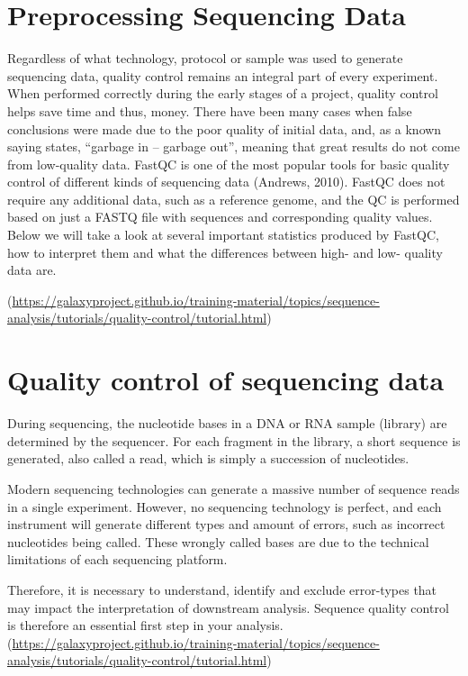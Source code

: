 \section{Preprocessing Sequencing Data}
Regardless of what technology, protocol or sample was used to generate sequencing data, quality control remains an integral part
of every experiment. When performed correctly during the early stages of a project, quality control helps save time and thus,
money. There have been many cases when false conclusions were made due to the poor quality of initial data, and, as a known
saying states, “garbage in – garbage out”, meaning that great results do not come from low-quality data.
FastQC is one of the most popular tools for basic quality control of different kinds of sequencing data (Andrews, 2010).
FastQC does not require any additional data, such as a reference genome, and the QC is performed based on just a FASTQ file with
sequences and corresponding quality values. Below we will take a look at several important statistics produced by FastQC, how to
interpret them and what the differences between high- and low- quality data are.

(\url{https://galaxyproject.github.io/training-material/topics/sequence-analysis/tutorials/quality-control/tutorial.html})


\section{Quality control of sequencing data}  
During sequencing, the nucleotide bases in a DNA or RNA sample (library) are determined by the sequencer. For each fragment in the library, a short sequence is generated, also called a read, which is simply a succession of nucleotides.

Modern sequencing technologies can generate a massive number of sequence reads in a single experiment. However, no sequencing technology is perfect, and each instrument will generate different types and amount of errors, such as incorrect nucleotides being called. These wrongly called bases are due to the technical limitations of each sequencing platform.

Therefore, it is necessary to understand, identify and exclude error-types that may impact the interpretation of downstream analysis. Sequence quality control is therefore an essential first step in your analysis. (\url{https://galaxyproject.github.io/training-material/topics/sequence-analysis/tutorials/quality-control/tutorial.html})  


